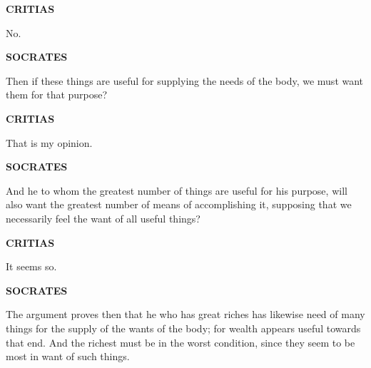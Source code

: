 \documentclass[11pt,letter]{article}
\begin{document}
\par \textbf{CRITIAS}
\par   No.

\par \textbf{SOCRATES}
\par   Then if these things are useful for supplying the needs of the body, we must want them for that purpose?

\par \textbf{CRITIAS}
\par   That is my opinion.

\par \textbf{SOCRATES}
\par   And he to whom the greatest number of things are useful for his purpose, will also want the greatest number of means of accomplishing it, supposing that we necessarily feel the want of all useful things?

\par \textbf{CRITIAS}
\par   It seems so.

\par \textbf{SOCRATES}
\par   The argument proves then that he who has great riches has likewise need of many things for the supply of the wants of the body; for wealth appears useful towards that end. And the richest must be in the worst condition, since they seem to be most in want of such things.

\par 
 
\end{document}
